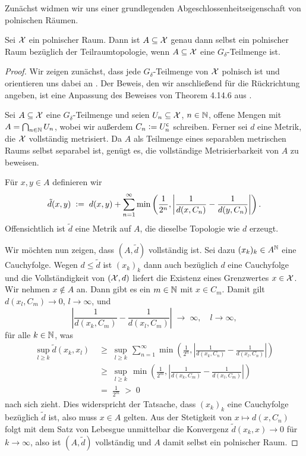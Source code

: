 \documentclass[../thesis/thesis.tex]{subfiles}
\begin{document}
	Zunächst widmen wir uns einer grundlegenden Abgeschlossenheitseigenschaft von polnischen Räumen.
	
	\begin{Satz}[Alexandroff]
		\label{satz:alexandroff}
		Sei $\mathcal{X}$ ein polnischer Raum. Dann ist $A \subseteq \mathcal{X}$ genau dann selbst ein polnischer Raum bezüglich der Teilraumtopologie, 
		wenn $A \subseteq \mathcal{X}$ eine $G_\delta$-Teilmenge ist.
	\end{Satz}
	
	\begin{proof}
		Wir zeigen zunächst, dass jede $G_\delta$-Teilmenge von $\mathcal{X}$ polnisch ist und orientieren uns dabei an \cite[Theorem 7]{JordanBell.2014}. Der Beweis, den wir anschließend für 
		die Rückrichtung angeben, ist eine Anpassung des Beweises von Theorem 4.14.6 aus \cite{Simon.2015}.
		
		Sei $A \subseteq \mathcal{X}$ eine $G_\delta$-Teilmenge und seien 
		$U_n \subseteq \mathcal{X}$, $n \in \mathbb{N}$, offene Mengen mit 
		$A = \bigcap_{n \in \mathbb{N}} U_n$, wobei wir außerdem 
		$C_n \vcentcolon = U_n^{\mathsf{c}}$ schreiben. Ferner sei 
		$d$ eine Metrik, die $\mathcal{X}$ vollständig metrisiert. 
		Da $A$ als Teilmenge eines separablen metrischen Raums 
		selbst separabel ist, genügt es, die vollständige Metrisierbarkeit 
		von $A$ zu beweisen.
		
		Für $x, y \in A$ definieren wir
		\[\tilde{d}(x, y) \; \vcentcolon = \; d(x, y) + \sum_{n=1}^{\infty} \min \left(
		\frac{1}{2^n}, \left| \frac{1}{d(x, C_n)} - \frac{1}{d(y, C_n)} \right|
		\right) \text{.}\]
		Offensichtlich ist $\tilde{d}$ eine Metrik auf $A$, 
		die dieselbe Topologie wie $d$ erzeugt. 
		
		Wir möchten nun zeigen, dass $(A, \tilde{d})$ vollständig ist. 
		Sei dazu $(x_k)_k \in A^{\mathbb{N}}$ eine Cauchyfolge. Wegen $d \leq \tilde{d}$ 
		ist $(x_k)_k$ dann auch bezüglich $d$ eine Cauchyfolge und die 
		Vollständigkeit von $(\mathcal{X}, d)$ liefert die Existenz eines Grenzwertes 
		$x \in \mathcal{X}$. Wir nehmen $x \notin A$ an. Dann gibt es ein $m \in \mathbb{N}$ mit 
		$x \in C_m$. Damit gilt $d(x_l, C_m) \to 0$, $l \to \infty$, und
		$$ \left| \frac{1}{d(x_k, C_m)} -
		\frac{1}{d(x_l, C_m)} \right| \; \to \; \infty, \quad l \to \infty,$$
		für alle $k \in \mathbb{N}$, was
		\begin{align*}
			\sup_{l \geq k} \tilde{d}(x_k, x_l) \; &\geq \; \sup_{l \geq k} \, \sum_{n=1}^{\infty} \min \left(\frac{1}{2^n}, \left| \frac{1}{d(x_k, C_n)} -\frac{1}{d(x_l, C_n)} \right|\right) \\
			                                       &\geq \; \sup_{l \geq k} \, \min \left(\frac{1}{2^m}, \left| \frac{1}{d(x_k, C_m)} -\frac{1}{d(x_l, C_m)} \right|\right) \\
			                                       &=    \; \frac{1}{2^m} \; > \; 0
		\end{align*}
		nach sich zieht. Dies widerspricht der Tatsache, dass $(x_k)_k$ eine Cauchyfolge 
		bezüglich $\tilde{d}$ ist, also muss $x \in A$ gelten. 
		Aus der Stetigkeit von $x \mapsto d(x, C_n)$ folgt mit dem 
		Satz von Lebesgue unmittelbar die Konvergenz 
		$\tilde{d}(x_k, x) \to 0$ für $k \to \infty$,
		also ist $(A, \tilde{d})$ vollständig und $A$ damit selbst ein
		polnischer Raum.
		

\end{proof}
\end{document}
